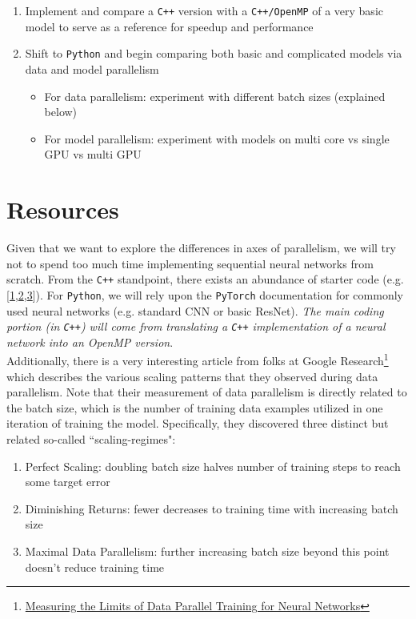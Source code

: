 \documentclass{article}
\begin{document}
\begin{enumerate}
  \item Implement and compare a \texttt{C++} version with a \texttt{C++/OpenMP} of a very basic model to serve as a reference for speedup and performance
  \item Shift to \texttt{Python} and begin comparing both basic and complicated models via data and model parallelism
  \begin{itemize}
    \item For data parallelism: experiment with different batch sizes (explained below)
    \item For model parallelism: experiment with models on multi core vs single GPU vs multi GPU
  \end{itemize}
\end{enumerate}

\section*{Resources}

Given that we want to explore the differences in axes of parallelism, we will try not to spend too much time implementing sequential neural networks from scratch. From the \texttt{C++} standpoint, there exists an abundance of starter code (e.g. [\href{https://github.com/Whiax/NeuralNetworkCpp/tree/master/src/neural}{1},\href{https://github.com/huangzehao/SimpleNeuralNetwork/blob/master/src/neural-net.cpp}{2},\href{https://github.com/arnobastenhof/mnist/tree/master/src}{3}]). For \texttt{Python}, we will rely upon the \texttt{PyTorch} documentation for commonly used neural networks (e.g. standard CNN or basic ResNet). \textit{The main coding portion (in \texttt{C++}) will come from translating a \texttt{C++} implementation of a neural network into an OpenMP version}. \\

Additionally, there is a very interesting article from folks at Google Research\footnote{\href{https://ai.googleblog.com/2019/03/measuring-limits-of-data-parallel.html}{Measuring the Limits of Data Parallel Training for Neural Networks}} which describes the various scaling patterns that they observed during data parallelism. Note that their measurement of data parallelism is directly related to the batch size, which is the number of training data examples utilized in one iteration of training the model. Specifically, they discovered three distinct but related so-called ``scaling-regimes":
\begin{enumerate}
  \item Perfect Scaling: doubling batch size halves number of training steps to reach some target error
  \item Diminishing Returns: fewer decreases to training time with increasing batch size
  \item Maximal Data Parallelism: further increasing batch size beyond this point doesn’t reduce training time
\end{enumerate}
\end{document}
